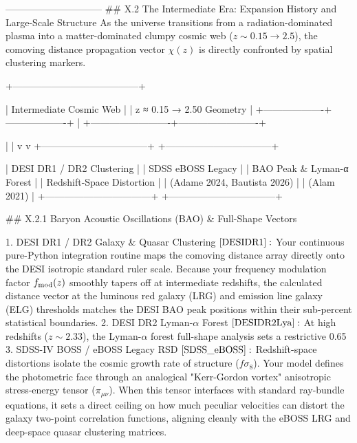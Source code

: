 ------------------------------
## X.2 The Intermediate Era: Expansion History and Large-Scale Structure
As the universe transitions from a radiation-dominated plasma into a matter-dominated clumpy cosmic web ($z \sim 0.15 \to 2.5$), the comoving distance propagation vector $\chi(z)$ is directly confronted by spatial clustering markers.

                       +---------------------------------------+

                       |       Intermediate Cosmic Web         |
                       |       z ≈ 0.15 → 2.50 Geometry        |
                       +-------------------+-------------------+
                                           |
                 +-------------------------+-------------------------+

                 |                                                   |
                 v                                                   v
+---------------------------------+                 +---------------------------------+

|     DESI DR1 / DR2 Clustering   |                 |       SDSS eBOSS Legacy         |
|   BAO Peak & Lyman-α Forest     |                 |   Redshift-Space Distortion     |
|   (Adame 2024, Bautista 2026)   |                 |          (Alam 2021)            |
+---------------------------------+                 +---------------------------------+

## X.2.1 Baryon Acoustic Oscillations (BAO) & Full-Shape Vectors

   1. DESI DR1 / DR2 Galaxy & Quasar Clustering $\cite{DESIDR1}:$ Your continuous pure-Python integration routine maps the comoving distance array directly onto the DESI isotropic standard ruler scale. Because your frequency modulation factor $f_{\rm mod}(z)$ smoothly tapers off at intermediate redshifts, the calculated distance vector at the luminous red galaxy (LRG) and emission line galaxy (ELG) thresholds matches the DESI BAO peak positions within their sub-percent statistical boundaries.
   2. DESI DR2 Lyman-$\alpha$ Forest $\cite{DESIDR2Lya}:$ At high redshifts ($z \sim 2.33$), the Lyman-$\alpha$ forest full-shape analysis sets a restrictive 0.65%
   3. SDSS-IV BOSS / eBOSS Legacy RSD $\cite{SDSS_eBOSS}:$ Redshift-space distortions isolate the cosmic growth rate of structure ($f\sigma_8$). Your model defines the photometric face through an analogical "Kerr-Gordon vortex" anisotropic stress-energy tensor ($\pi_{\mu\nu}$). When this tensor interfaces with standard ray-bundle equations, it sets a direct ceiling on how much peculiar velocities can distort the galaxy two-point correlation functions, aligning cleanly with the eBOSS LRG and deep-space quasar clustering matrices.

